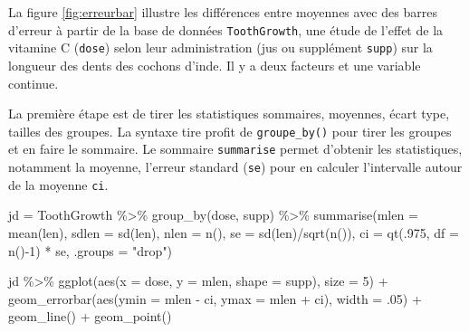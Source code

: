 \documentclass[
]{book}
\newenvironment{Shaded}{}{}
\newcommand{\AttributeTok}[1]{#1}
\newcommand{\DecValTok}[1]{#1}
\newcommand{\FunctionTok}[1]{#1}
\newcommand{\NormalTok}[1]{#1}
\newcommand{\OtherTok}[1]{#1}
\newcommand{\SpecialCharTok}[1]{#1}
\newcommand{\StringTok}[1]{#1}
\begin{document}
La figure \ref{fig:erreurbar} illustre les différences entre moyennes avec des barres d'erreur à partir de la base de données \texttt{ToothGrowth}, une étude de l'effet de la vitamine C (\texttt{dose}) selon leur administration (jus ou supplément \texttt{supp}) sur la longueur des dents des cochons d'inde. Il y a deux facteurs et une variable continue.

La première étape est de tirer les statistiques sommaires, moyennes, écart type, tailles des groupes. La syntaxe tire profit de \texttt{groupe\_by()} pour tirer les groupes et en faire le sommaire. Le sommaire \texttt{summarise} permet d'obtenir les statistiques, notamment la moyenne, l'erreur standard (\texttt{se}) pour en calculer l'intervalle autour de la moyenne \texttt{ci}.

\begin{Shaded}
\begin{Highlighting}[]
\NormalTok{jd }\OtherTok{=}\NormalTok{ ToothGrowth }\SpecialCharTok{\%\textgreater{}\%} 
  \FunctionTok{group\_by}\NormalTok{(dose, supp) }\SpecialCharTok{\%\textgreater{}\%} 
  \FunctionTok{summarise}\NormalTok{(}\AttributeTok{mlen =} \FunctionTok{mean}\NormalTok{(len),}
            \AttributeTok{sdlen =} \FunctionTok{sd}\NormalTok{(len),}
            \AttributeTok{nlen =} \FunctionTok{n}\NormalTok{(), }
            \AttributeTok{se =} \FunctionTok{sd}\NormalTok{(len)}\SpecialCharTok{/}\FunctionTok{sqrt}\NormalTok{(}\FunctionTok{n}\NormalTok{()), }
            \AttributeTok{ci =} \FunctionTok{qt}\NormalTok{(.}\DecValTok{975}\NormalTok{, }\AttributeTok{df =} \FunctionTok{n}\NormalTok{()}\SpecialCharTok{{-}}\DecValTok{1}\NormalTok{) }\SpecialCharTok{*}\NormalTok{ se,}
            \AttributeTok{.groups =} \StringTok{"drop"}\NormalTok{)}

\NormalTok{jd }\SpecialCharTok{\%\textgreater{}\%} 
  \FunctionTok{ggplot}\NormalTok{(}\FunctionTok{aes}\NormalTok{(}\AttributeTok{x =}\NormalTok{ dose,}
             \AttributeTok{y =}\NormalTok{ mlen, }
             \AttributeTok{shape =}\NormalTok{ supp),}
         \AttributeTok{size =} \DecValTok{5}\NormalTok{) }\SpecialCharTok{+} 
    \FunctionTok{geom\_errorbar}\NormalTok{(}\FunctionTok{aes}\NormalTok{(}\AttributeTok{ymin =}\NormalTok{ mlen }\SpecialCharTok{{-}}\NormalTok{ ci,}
                      \AttributeTok{ymax =}\NormalTok{ mlen }\SpecialCharTok{+}\NormalTok{ ci), }
                  \AttributeTok{width =}\NormalTok{ .}\DecValTok{05}\NormalTok{) }\SpecialCharTok{+}
    \FunctionTok{geom\_line}\NormalTok{() }\SpecialCharTok{+}
    \FunctionTok{geom\_point}\NormalTok{()}
\end{Highlighting}
\end{Shaded}
\end{document}
